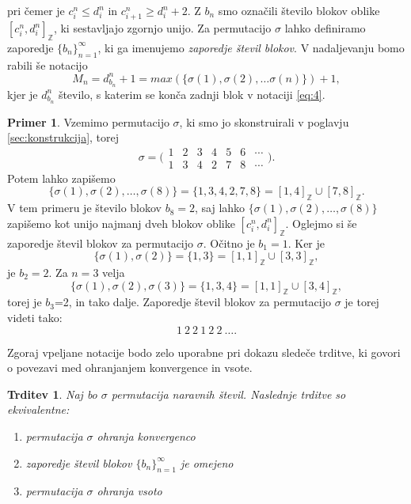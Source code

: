 \documentclass[12pt,a4paper,reqno]{amsart}
\theoremstyle{definition} %
\newtheorem{primer}[definicija]{Primer}
\theoremstyle{plain} %
\newtheorem{trditev}[definicija]{Trditev}
\newcommand{\Z}{\mathbb Z}
\begin{document}
pri čemer je $c^n_i \leq d^n_i$ in $c^n_{i+1} \geq d^n_i +2$. Z $b_n$ smo označili število blokov oblike $[c^n_i, d^n_i]_{\Z}$, ki sestavljajo zgornjo unijo. Za permutacijo $\sigma$ lahko definiramo zaporedje $\{b_n\}^{\infty}_{n=1}$, ki ga imenujemo \emph{zaporedje števil blokov}. %
V nadaljevanju bomo rabili še notacijo $$M_n=d^n_{b_n}+1=max(\{ \sigma (1), \sigma (2), \ldots \sigma (n) \})+1,$$ kjer je $d^n_{b_n}$ število, s katerim se konča zadnji blok v notaciji \ref{eq:4}.

\begin{primer}
Vzemimo permutacijo $\sigma$, ki smo jo skonstruirali v poglavju \ref{sec:konstrukcija}, torej 
$$\sigma = \bigg(\begin{matrix}
    1 & 2 & 3 & 4 & 5 & 6 & \cdots   \\   1 & 3 & 4 & 2 & 7 & 8 & \cdots
  \end{matrix}\bigg).$$
Potem lahko zapišemo $$\{\sigma(1), \sigma(2), \ldots, \sigma(8) \} = \{ 1,3,4,2,7,8\} = [1,4]_{\Z} \cup [7,8]_{\Z}.$$ V tem primeru je število blokov $b_8=2$, saj lahko $\{\sigma(1), \sigma(2), \ldots, \sigma(8) \}$ zapišemo kot unijo najmanj dveh blokov oblike  $[c^n_i, d^n_i]_{\Z}$.
Oglejmo si še zaporedje števil blokov za permutacijo $\sigma$. Očitno je $b_1=1$. Ker je $$\{\sigma(1), \sigma(2) \} = \{ 1,3\} = [1,1]_{\Z} \cup [3,3]_{\Z},$$ je $b_2=2$. Za $n=3$ velja $$\{\sigma(1), \sigma(2), \sigma(3) \} = \{ 1,3,4\} = [1,1]_{\Z} \cup [3,4]_{\Z},$$ torej je $b_3$=2, in tako dalje. Zaporedje števil blokov za permutacijo $\sigma$ je torej videti tako: $$1\:2\:2\:1\:2\:2\:\ldots.$$
\end{primer}

Zgoraj vpeljane notacije bodo zelo uporabne pri dokazu sledeče trditve, ki govori o povezavi med ohranjanjem konvergence in vsote.

\begin{trditev} \label{trd:ohranjanje}
Naj bo $\sigma$ permutacija naravnih števil. Naslednje trditve so ekvivalentne:
\begin{enumerate}
\item permutacija $\sigma$ ohranja konvergenco \label{itm:1}
\item zaporedje števil blokov $\{b_n\}^{\infty}_{n=1}$ je omejeno \label{itm:2}
\item permutacija $\sigma$ ohranja vsoto \label{itm:3}
\end{enumerate}
\end{trditev}
\end{document}
